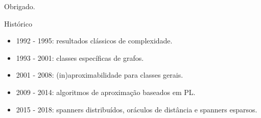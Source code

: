 \documentclass[dvipsnames]{beamer}
\begin{document}
  

\begin{frame}{}
  \begin{center}
    Obrigado.
    \end{center}
  \end{frame}

\appendix

\begin{frame}{Histórico \hyperlink{hist}{\beamergotobutton{$\leftarrow$}}}
  \hypertarget{histmaior}{}
  \begin{itemize}    
  \item <1-> 1992 - 1995: resultados clássicos de complexidade.
  \item <2-> 1993 - 2001: classes específicas de grafos.
  \item <3-> 2001 - 2008: (in)aproximabilidade para classes gerais.
  \item <4-> 2009 - 2014: algoritmos de aproximação baseados em PL.
  \item <5-> 2015 - 2018: spanners distribuídos, oráculos de distância e
    spanners esparsos.    
  \end{itemize}
\end{frame}
\end{document}
